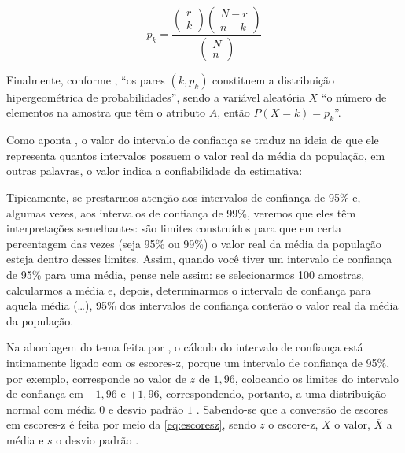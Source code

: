 	\begin{equation}
	    p_k = \dfrac{\begin{pmatrix}
	r \\
	k
	\end{pmatrix}\begin{pmatrix}
	N - r \\
	n - k
	\end{pmatrix}}{\begin{pmatrix}
	N \\
	n
	\end{pmatrix}}
	\end{equation}
	
	Finalmente, conforme , ``os pares $(k, p_k)$ constituem a distribuição hipergeométrica de probabilidades'', sendo a variável aleatória $X$ ``o número de elementos na amostra que têm o atributo $A$, então $P(X = k) = p_k$''.
	
	Como aponta , o valor do intervalo de confiança se traduz na ideia de que ele representa quantos intervalos possuem o valor real da média da população, em outras palavras, o valor indica a confiabilidade da estimativa:
	
	\begin{citacao}
		Tipicamente, se prestarmos atenção aos intervalos de confiança de 95\% e, algumas	vezes, aos intervalos de confiança de 99\%, veremos que eles têm interpretações semelhantes: são limites construídos para que em certa percentagem das vezes (seja 95\% ou 99\%) o	valor real da média da população esteja dentro desses limites. Assim, quando você tiver um intervalo de confiança de 95\% para uma média, pense nele assim: se selecionarmos 100 amostras, calcularmos a média e, depois, determinarmos o intervalo de confiança para aquela média (\dots), 95\% dos intervalos de confiança conterão o valor real da média da população.
	\end{citacao}
	
	Na abordagem do tema feita por , o cálculo do intervalo de confiança está intimamente ligado com os escores-z, porque um intervalo de confiança de 95\%, por exemplo, corresponde ao valor de $z$ de $1,96$, colocando os limites do intervalo de confiança em $-1,96$ e $+1,96$, correspondendo, portanto, a uma distribuição normal com média $0$ e desvio padrão $1$ \cite[p. 45]{field2009}. Sabendo-se que a conversão de escores em escores-z é feita por meio da \autoref{eq:escoresz}, sendo $z$ o escore-z, $X$ o valor, $\overline{X}$ a média e $s$ o desvio padrão \cite[p. 41]{field2009}.
	

